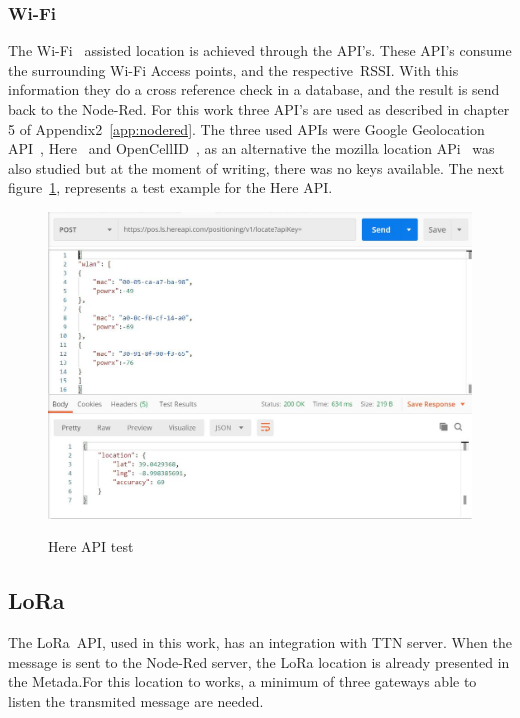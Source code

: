 \subsubsection{Wi-Fi} %
\label{sec:wifi_sota}
The Wi-Fi~\cite{wifi} assisted location is achieved through the API's. These API's consume the surrounding Wi-Fi Access points, and the respective~\gls{RSSI}. With this information they do a cross reference check in a database, and the result is send back to the Node-Red. For this work three API's are used as described in chapter 5 of Appendix2~\ref{app:nodered}. The three used APIs were Google Geolocation API~\cite{GoogleLocation}, Here~\cite{Here} and OpenCellID~\cite{OpenCell}, as an alternative the mozilla location APi~\cite{Mozilla} was also studied but at the moment of writing, there was no keys available. The next figure~\ref{fig:Google_API}, represents a test example for the Here API.\newline


 
  \begin{figure}[htbp]
  \centering
  
    {\includegraphics[width=\linewidth]{Chapters/Figures/herepost.JPG}}
 
  \caption{Here API test}
  \label{fig:Google_API}
\end{figure}








\newpage
\subsection{LoRa} %
\label{sec:lora_api_sota}
The LoRa~\gls{API}, used in this work, has an integration with TTN server. When the message is sent to the Node-Red server, the LoRa location is already presented in the Metada.For this location to works, a minimum of three gateways  able to listen the transmited message are needed. 

